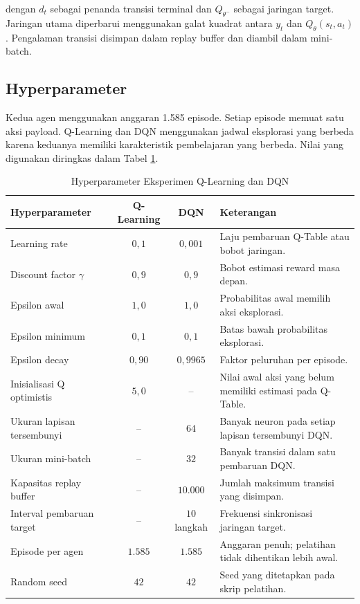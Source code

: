 dengan \(d_t\) sebagai penanda transisi terminal dan \(Q_{\theta^-}\) sebagai jaringan target. Jaringan utama diperbarui menggunakan galat kuadrat antara \(y_t\) dan \(Q_\theta(s_t,a_t)\). Pengalaman transisi disimpan dalam replay buffer dan diambil dalam mini-batch.

\subsection{Hyperparameter}

Kedua agen menggunakan anggaran 1.585 episode. Setiap episode memuat satu aksi payload. Q-Learning dan DQN menggunakan jadwal eksplorasi yang berbeda karena keduanya memiliki karakteristik pembelajaran yang berbeda. Nilai yang digunakan diringkas dalam Tabel \ref{tab:hyperparameter}.

\begin{table}[H]
\centering
\caption{Hyperparameter Eksperimen Q-Learning dan DQN}
\label{tab:hyperparameter}
\begin{tabular}{|p{4cm}|c|c|p{5cm}|}
\hline
\textbf{Hyperparameter} & \textbf{Q-Learning} & \textbf{DQN} & \textbf{Keterangan} \\ \hline
Learning rate & \(0{,}1\) & \(0{,}001\) & Laju pembaruan Q-Table atau bobot jaringan. \\ \hline
Discount factor \(\gamma\) & \(0{,}9\) & \(0{,}9\) & Bobot estimasi reward masa depan. \\ \hline
Epsilon awal & \(1{,}0\) & \(1{,}0\) & Probabilitas awal memilih aksi eksplorasi. \\ \hline
Epsilon minimum & \(0{,}1\) & \(0{,}1\) & Batas bawah probabilitas eksplorasi. \\ \hline
Epsilon decay & \(0{,}90\) & \(0{,}9965\) & Faktor peluruhan per episode. \\ \hline
Inisialisasi Q optimistis & \(5{,}0\) & -- & Nilai awal aksi yang belum memiliki estimasi pada Q-Table. \\ \hline
Ukuran lapisan tersembunyi & -- & \(64\) & Banyak neuron pada setiap lapisan tersembunyi DQN. \\ \hline
Ukuran mini-batch & -- & \(32\) & Banyak transisi dalam satu pembaruan DQN. \\ \hline
Kapasitas replay buffer & -- & \(10.000\) & Jumlah maksimum transisi yang disimpan. \\ \hline
Interval pembaruan target & -- & \(10\) langkah & Frekuensi sinkronisasi jaringan target. \\ \hline
Episode per agen & \(1.585\) & \(1.585\) & Anggaran penuh; pelatihan tidak dihentikan lebih awal. \\ \hline
Random seed & \(42\) & \(42\) & Seed yang ditetapkan pada skrip pelatihan. \\ \hline
\end{tabular}
\end{table}

